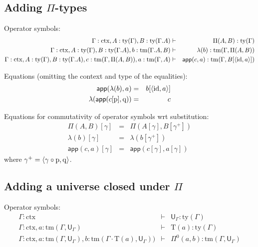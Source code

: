 \documentclass{lmcs}
\def\Ta{\mathrm{T}}
\def\id{\mathrm{id}}
\newcommand{\ctx}{\mathrm{ctx}}
\newcommand{\ty}{\mathrm{ty}}
\newcommand{\tm}{\mathrm{tm}}
\def\p{\mathrm{p}}
\def\q{\mathrm{q}}
\def\app{\mathsf{app}}
\def\U{\mathsf{U}}
\begin{document}
\subsection{Adding $\Pi$-types}
\hspace{1em}

Operator symbols:
\begin{eqnarray*}
\Gamma : \ctx, A : \ty(\Gamma), B : \ty(\Gamma.A)&\vdash& \Pi(A,B) : \ty(\Gamma)\\
\Gamma : \ctx, A : \ty(\Gamma), B : \ty(\Gamma.A), b : \tm(\Gamma.A, B) &\vdash& \lambda(b) : \tm(\Gamma,\Pi(A,B))\\
\Gamma : \ctx, A : \ty(\Gamma), B : \ty(\Gamma.A), c :  \tm(\Gamma,\Pi(A,B)), a : \tm(\Gamma, A) &\vdash& \app(c,a) : \tm(\Gamma, B[\tuple{\id,a}])
\end{eqnarray*}

Equations (omitting the context and type of the equalities):
 \begin{eqnarray*}
 \app(\lambda(b),a) &=& b[\tuple{\id,a}]\\
 \lambda(\app(c[\p],\q)) &=& c
 \end{eqnarray*}
 
 Equations for commutativity of operator symbols wrt substitution:
 \begin{eqnarray*}
\Pi(A,B)[ \gamma ] &=& \Pi(A [ \gamma ], B[ \gamma^+ ])\\
\lambda(b) [ \gamma ] &=& \lambda(b[\gamma^+ ])\\
\app(c,a) [ \gamma ] &=& \app(c[ \gamma ], a[ \gamma ] )
\end{eqnarray*}
where $\gamma^+ = \tuple{\gamma \circ \p, \q}$.

\subsection{Adding a universe closed under $\Pi$}
\hspace{1em}

Operator symbols:
\begin{eqnarray*}
\Gamma : \ctx &\vdash& \U_\Gamma : \ty(\Gamma)\\
\Gamma : \ctx, a : \tm(\Gamma,\U_\Gamma) &\vdash& {\Ta}(a) : \ty(\Gamma)\\
\Gamma : \ctx,
a : \tm(\Gamma,\U_\Gamma),
b :  \tm(\Gamma \cdot \Ta(a), \U_\Gamma))
&\vdash&
 \Pi^0(a,b) : \tm(\Gamma,\U_\Gamma)
\end{eqnarray*}
\end{document}
